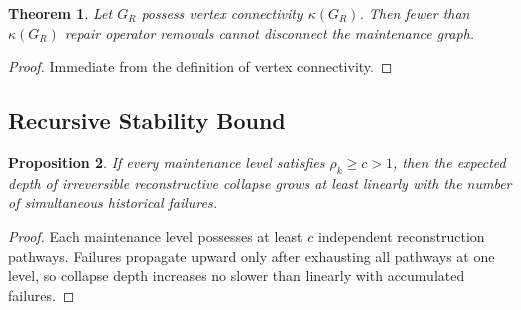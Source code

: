 \documentclass[12pt,oneside]{article}
\theoremstyle{plain}
\newtheorem{theorem}{Theorem}[section]
\newtheorem{proposition}[theorem]{Proposition}
\theoremstyle{definition}
\theoremstyle{remark}
\theoremstyle{plain}
\begin{document}
\begin{theorem}
Let $G_R$ possess vertex connectivity $\kappa(G_R)$. Then fewer than $\kappa(G_R)$ repair
operator removals cannot disconnect the maintenance graph.
\end{theorem}

\begin{proof}
Immediate from the definition of vertex connectivity.
\end{proof}

\subsection{Recursive Stability Bound}

\begin{proposition}
If every maintenance level satisfies $\rho_k \ge c > 1$, then the expected depth of irreversible
reconstructive collapse grows at least linearly with the number of simultaneous historical failures.
\end{proposition}

\begin{proof}
Each maintenance level possesses at least $c$ independent reconstruction pathways. Failures
propagate upward only after exhausting all pathways at one level, so collapse depth increases no
slower than linearly with accumulated failures.
\end{proof}

\newpage
\end{document}
